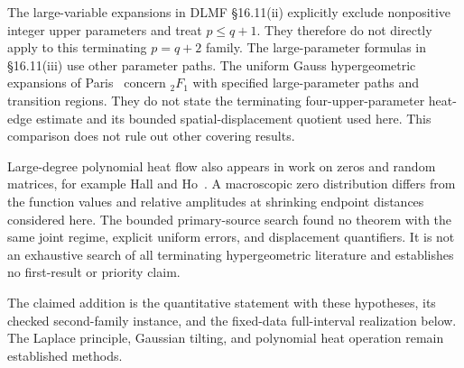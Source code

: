The large-variable expansions in DLMF \S16.11(ii) explicitly exclude
nonpositive integer upper parameters and treat $p\le q+1$.
They therefore do not directly apply to this terminating $p=q+2$
family. The large-parameter formulas in \S16.11(iii) use other
parameter paths. The uniform Gauss hypergeometric expansions of
Paris~\cite{Paris2018,Paris2021} concern ${}_2F_1$ with specified
large-parameter paths and transition regions. They do not state the
terminating four-upper-parameter heat-edge estimate and its bounded
spatial-displacement quotient used here. This comparison does not
rule out other covering results.

Large-degree polynomial heat flow also appears in work on zeros and
random matrices, for example Hall and Ho~\cite{HallHo2025}.
A macroscopic zero distribution differs from the function values and
relative amplitudes at shrinking endpoint distances considered here.
The bounded primary-source search found no theorem with the same
joint regime, explicit uniform errors, and displacement quantifiers.
It is not an exhaustive search of all terminating hypergeometric
literature and establishes no first-result or priority claim.

The claimed addition is the quantitative statement with these
hypotheses, its checked second-family instance, and the fixed-data
full-interval realization below. The Laplace principle, Gaussian
tilting, and polynomial heat operation remain established methods.
